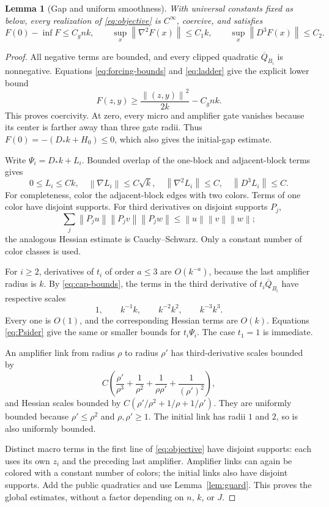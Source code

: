\documentclass[11pt]{article}
\newtheorem{lemma}[theorem]{Lemma}
\theoremstyle{definition}
\theoremstyle{remark}
\newcommand{\norm}[1]{\left\|#1\right\|}
\begin{document}
\begin{lemma}[Gap and uniform smoothness]\label{lem:smooth}
With universal constants fixed as below, every realization of \eqref{eq:objective} is $C^\infty$, coercive, and satisfies
\begin{equation}\label{eq:regularity}
 F(0)-\inf F\le C_gnk,\qquad
 \sup_x\norm{\nabla^2F(x)}\le C_1k,\qquad
 \sup_x\norm{D^3F(x)}\le C_2.
\end{equation}
\end{lemma}
\begin{proof}
All negative terms are bounded, and every clipped quadratic
$\overline Q_{B_i}$ is nonnegative. Equations
\eqref{eq:forcing-bounds} and \eqref{eq:ladder} give the explicit lower bound
\[
 F(z,y)\ge\frac{\norm{(z,y)}^2}{2k}-C_gnk.
\]
This proves coercivity. At zero, every micro and amplifier gate vanishes
because its center is farther away than three gate radii. Thus
$F(0)=-(D_*k+H_0)\le0$, which also gives the initial-gap estimate.

Write $\Psi_i=D_*k+L_i$. Bounded overlap of the one-block and adjacent-block terms gives
\begin{equation}\label{eq:Psider}
 0\le L_i\le Ck,\quad \norm{\nabla L_i}\le C\sqrt k,\quad
 \norm{\nabla^2L_i}\le C,\quad \norm{D^3L_i}\le C.
\end{equation}
For completeness, color the adjacent-block edges with two colors. Terms of one color have disjoint supports. For third derivatives on disjoint supports $P_j$,
\[
 \sum_j\norm{P_ju}\norm{P_jv}\norm{P_jw}
 \le\norm u\norm v\norm w;
\]
the analogous Hessian estimate is Cauchy--Schwarz. Only a constant number of color classes is used.

For $i\ge2$, derivatives of $t_i$ of order $a\le3$ are $O(k^{-a})$, because the last amplifier radius is $k$. By \eqref{eq:cap-bounds}, the terms in the third derivative of $t_i\overline Q_{B_i}$ have respective scales
\[
 1,\qquad k^{-1}k,\qquad k^{-2}k^2,\qquad k^{-3}k^3.
\]
Every one is $O(1)$, and the corresponding Hessian terms are $O(k)$. Equations \eqref{eq:Psider} give the same or smaller bounds for $t_i\Psi_i$. The case $t_1=1$ is immediate.

An amplifier link from radius $\rho$ to radius $\rho'$ has third-derivative scales bounded by
\[
 C\left(\frac{\rho'}{\rho^3}+\frac1{\rho^2}
          +\frac1{\rho\rho'}+\frac1{(\rho')^2}\right),
\]
and Hessian scales bounded by
$C(\rho'/\rho^2+1/\rho+1/\rho')$.
They are uniformly bounded because $\rho'\le\rho^2$ and $\rho,\rho'\ge1$. The initial link has radii $1$ and $2$, so is also uniformly bounded.

Distinct macro terms in the first line of \eqref{eq:objective} have disjoint supports: each uses its own $z_i$ and the preceding last amplifier. Amplifier links can again be colored with a constant number of colors; the initial links also have disjoint supports. Add the public quadratics and use Lemma~\ref{lem:guard}. This proves the global estimates, without a factor depending on $n$, $k$, or $J$.
\end{proof}
\end{document}
